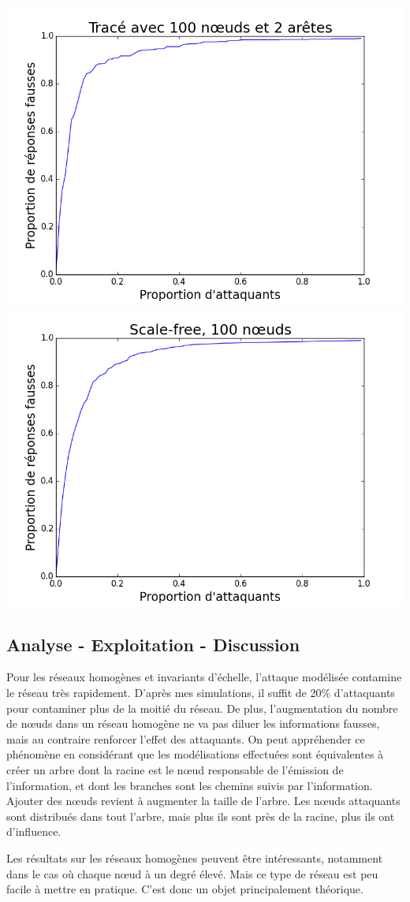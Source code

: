 \documentclass[12pt,a4paper]{article}
\begin{document}
\begin{center}
\includegraphics[width=0.49\linewidth]{../resultats/atkaleat/atkaleat-100-2-1.png}
\includegraphics[width=0.49\linewidth]{../resultats/scale-free/sf-t1-n100-1-it100.png}
 \label{comp}
\end{center}
	



\subsection{Analyse - Exploitation - Discussion} %

Pour les réseaux homogènes et invariants d'échelle, l'attaque modélisée contamine le réseau très rapidement.
D'après mes simulations, il suffit de 20\% d'attaquants pour contaminer plus de la moitié du réseau.
De plus, l'augmentation du nombre de nœuds dans un réseau homogène ne va pas diluer les informations fausses, mais au contraire renforcer l'effet des attaquants.
On peut appréhender ce phénomène en considérant que les modélisations effectuées sont équivalentes à créer un arbre dont la racine est le nœud responsable de l'émission de l'information, et dont les branches sont les chemins suivis par l'information.
Ajouter des nœuds revient à augmenter la taille de l'arbre.
Les nœuds attaquants sont distribués dans tout l'arbre, mais plus ils sont près de la racine, plus ils ont d'influence.

Les résultats sur les réseaux homogènes peuvent être intéressants, notamment dans le cas où chaque nœud à un degré élevé.
Mais ce type de réseau est peu facile à mettre en pratique.
C'est donc un objet principalement théorique.
\end{document}
